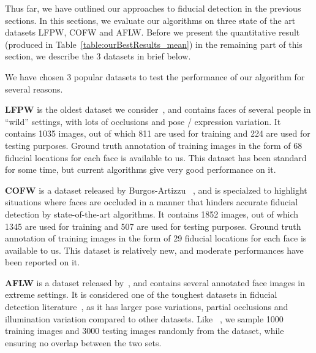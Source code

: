 \label{sec:basic_algorithm}

Thus far, we have outlined our approaches to fiducial detection in the previous sections.
In this sections, we evaluate our algorithms on three state of the art datasets
LFPW, COFW and AFLW. Before we present the quantitative result (produced in Table~\ref{table:ourBestResults_mean}) in the remaining
part of this section, we describe the 3 datasets in brief below. 
 
 

We have chosen 3 popular datasets to test the performance of our algorithm for several reasons.

\textbf{LFPW}
is the oldest dataset we consider~\cite{kumarPAMI13_faceExem}, and contains faces of several people in ``wild'' settings,
with lots of occlusions and pose / expression variation. It contains 1035 images, out of which
811 are used for training and 224 are used for testing purposes. Ground truth annotation of
training images in the form of 68 fiducial locations for each face is available to us. This dataset
has been standard for some time, but current algorithms give very good performance 
on it.

\textbf{COFW}
is a dataset released by Burgos-Artizzu \etal~\cite{artizzzuICCV13_COFW}, and is
specialzed to highlight situations where faces are occluded in a manner
that hinders accurate fiducial detection by state-of-the-art algorithms.
It contains 1852 images, out of which
1345 are used for training and 507 are used for testing purposes. Ground truth annotation of
training images in the form of 29 fiducial locations for each face is available to us. This dataset
is relatively new, and moderate performances have been reported on it.

\textbf{AFLW}
is a dataset released by~\cite{koetsingerBFIAT11_AFLW}, and contains several annotated face images
in extreme settings. It is considered one of the toughest datasets in fiducial detection
literature~\cite{smithECCV14_ED,zhangECCV14_deepfacealign}, as it has larger pose variations, 
partial occlusions and illumination variation compared to other datasets. Like
~\cite{zhangECCV14_deepfacealign}, we sample 1000 training images and 3000 testing images
randomly from the dataset, while ensuring no overlap between the two sets.

